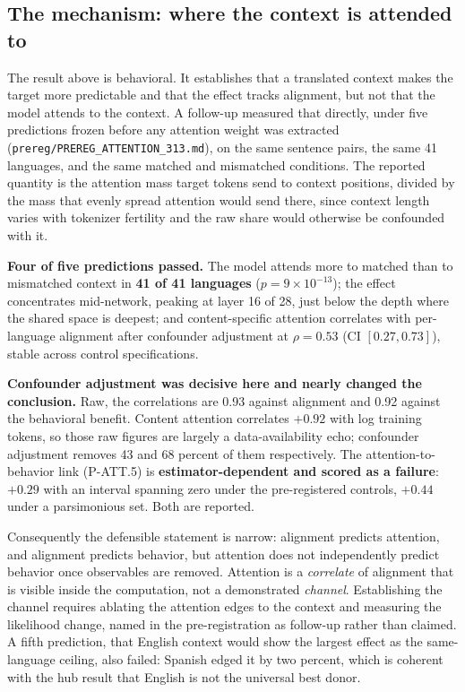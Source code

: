 \documentclass[11pt,a4paper]{article}
\begin{document}
\subsection{The mechanism: where the context is attended to}
\label{sec:attn}
The result above is behavioral. It establishes that a translated context
makes the target more predictable and that the effect tracks alignment, but
not that the model attends to the context. A follow-up measured that
directly, under five predictions frozen before any attention weight was
extracted (\texttt{prereg/PREREG\_ATTENTION\_313.md}), on the same sentence
pairs, the same 41 languages, and the same matched and mismatched
conditions. The reported quantity is the attention mass target tokens send
to context positions, divided by the mass that evenly spread attention would
send there, since context length varies with tokenizer fertility and the raw
share would otherwise be confounded with it.

\textbf{Four of five predictions passed.} The model attends more to matched
than to mismatched context in \textbf{41 of 41 languages}
($p = 9\times10^{-13}$); the effect concentrates mid-network, peaking at
layer 16 of 28, just below the depth where the shared space is deepest; and
content-specific attention correlates with per-language alignment after
confounder adjustment at $\rho = 0.53$ (CI $[0.27, 0.73]$), stable across control
specifications.

\textbf{Confounder adjustment was decisive here and nearly changed the conclusion.} Raw,
the correlations are 0.93 against alignment and 0.92 against the behavioral
benefit. Content attention correlates $+0.92$ with log training tokens, so
those raw figures are largely a data-availability echo; confounder adjustment removes 43
and 68 percent of them respectively. The attention-to-behavior link
(P-ATT.5) is \textbf{estimator-dependent and scored as a failure}: $+0.29$
with an interval spanning zero under the pre-registered controls, $+0.44$
under a parsimonious set. Both are reported.

Consequently the defensible statement is narrow: alignment predicts
attention, and alignment predicts behavior, but attention does not
independently predict behavior once observables are removed. Attention is a
\emph{correlate} of alignment that is visible inside the computation, not a
demonstrated \emph{channel}. Establishing the channel requires ablating the
attention edges to the context and measuring the likelihood change, named in
the pre-registration as follow-up rather than claimed. A fifth prediction,
that English context would show the largest effect as the same-language
ceiling, also failed: Spanish edged it by two percent, which is coherent
with the hub result that English is not the universal best donor.
\end{document}
